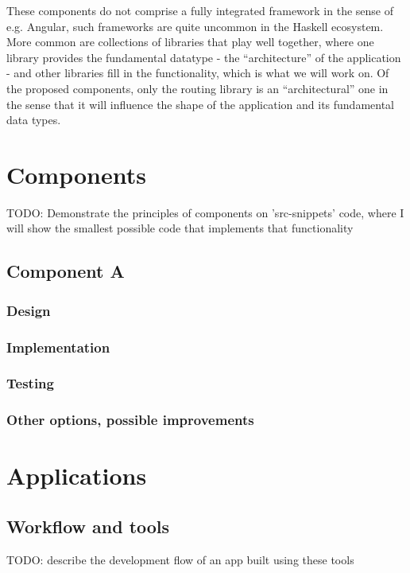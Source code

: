 \documentclass[english,odsaz]{fitthesis}
\begin{document}
These components do not comprise a fully integrated framework in the sense of
e.g. Angular, such frameworks are quite uncommon in the Haskell ecosystem. More
common are collections of libraries that play well together, where one library
provides the fundamental datatype - the ``architecture'' of the application - and
other libraries fill in the functionality, which is what we will work on. Of the
proposed components, only the routing library is an ``architectural'' one in the
sense that it will influence the shape of the application and its fundamental
data types.

\chapter{Components}
\label{sec:org0c7afbc}
TODO: Demonstrate the principles of components on 'src-snippets' code, where
I will show the smallest possible code that implements that functionality

\section{Component A}
\label{sec:orgd21e3e2}
\subsection{Design}
\label{sec:org3bbc113}
\subsection{Implementation}
\label{sec:org7f69366}
\subsection{Testing}
\label{sec:org0020086}
\subsection{Other options, possible improvements}
\label{sec:org12d3034}

\chapter{Applications}
\label{sec:org40edd24}
\section{Workflow and tools}
\label{sec:org4acb3af}
TODO: describe the development flow of an app built using these tools
\end{document}
